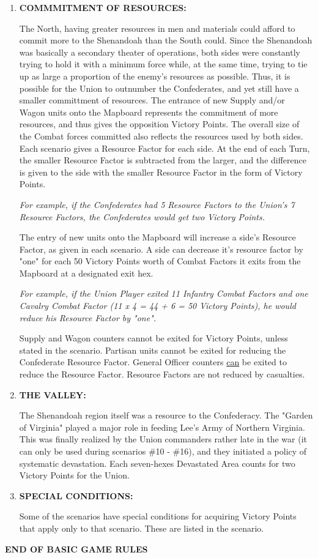 \begin{enumerate}
  \item \textbf{COMMMITMENT OF RESOURCES:}

  The North, having greater resources in men and materials could afford to commit more to the Shenandoah than the South could. Since the Shenandoah was basically a secondary theater of operations, both sides were constantly trying to hold it with a minimum force while, at the same time, trying to tie up as large a proportion of the enemy's resources as possible. Thus, it is possible for the Union to outnumber the Confederates, and yet still have a smaller committment of resources. The entrance of new Supply and/or Wagon units onto the Mapboard represents the commitment of more resources, and thus gives the opposition Victory Points. The overall size of the Combat forces committed also reflects the resources used by both sides. Each scenario gives a Resource Factor for each side. At the end of each Turn, the smaller Resource Factor is subtracted from the larger, and the difference is given to the side with the smaller Resource Factor in the form of Victory Points.

  \textit{For example, if the Confederates had 5 Resource Factors to the Union's 7 Resource Factors, the Confederates would get two Victory Points.}

  The entry of new units onto the Mapboard will increase a side's Resource Factor, as given in each scenario. A side can decrease it's resource factor by "one" for each 50 Victory Points worth of Combat Factors it exits from the Mapboard at a designated exit hex.

  \textit{For example, if the Union Player exited 11 Infantry Combat Factors and one Cavalry Combat Factor (11 x 4 = 44 + 6 = 50 Victory Points), he would reduce his Resource Factor by "one".}

  Supply and Wagon counters cannot be exited for Victory Points, unless stated in the scenario. Partisan units cannot be exited for reducing the Confederate Resource Factor. General Officer counters \underline{can} be exited to reduce the Resource Factor. Resource Factors are not reduced by casualties.

  \item \textbf{THE VALLEY:}

  The Shenandoah region itself was a resource to the Confederacy. The "Garden of Virginia" played a major role in feeding Lee's Army of Northern Virginia. This was finally realized by the Union commanders rather late in the war (it can only be used during scenarios \#10 - \#16), and they initiated a policy of systematic devastation. Each seven-hexes Devastated Area counts for two Victory Points for the Union.

  \item \textbf{SPECIAL CONDITIONS:}

  Some of the scenarios have special conditions for acquiring Victory Points that apply only to that scenario. These are listed in the scenario.
\end{enumerate}

{\large \textbf{END OF BASIC GAME RULES}}
